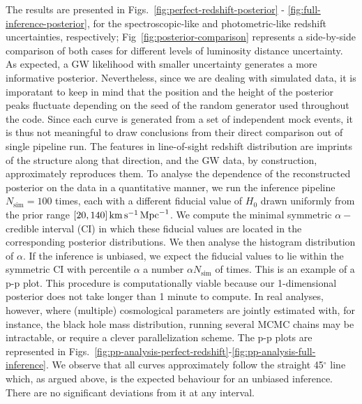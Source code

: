 \documentclass[%
preprint,
nofootinbib,
 amsmath,amssymb,
 aps,
]{revtex4-2}
\begin{document}
The results are presented in Figs.~\ref{fig:perfect-redshift-posterior} -
\ref{fig:full-inference-posterior}, for the spectroscopic-like and photometric-like redshift
uncertainties, respectively; Fig~\ref{fig:posterior-comparison} represents a side-by-side
comparison of both cases for different levels of luminosity distance uncertainty. As expected, a GW
likelihood with smaller uncertainty generates a more informative posterior. Nevertheless, since we
are dealing with simulated data, it is imporatant to keep in mind that the position and the height
of the posterior peaks fluctuate depending on the seed of the random generator used throughout the
code. Since each curve is generated from a set of independent mock events, it is thus not
meaningful to draw conclusions from their direct comparison out of single pipeline run. The
features in line-of-sight redshift distribution are imprints of the structure along that direction,
and the GW data, by construction, approximately reproduces them. To analyse the dependence of the
reconstructed posterior on the data in a quantitative manner, we run the inference pipeline
$N_\text{sim} = 100$ times, each with a different fiducial value of $H_0$ drawn uniformly from the
prior range $[20, 140] \, \rm{km} \, \rm{s}^{-1} \, \rm{Mpc}^{-1}$. We compute the minimal
symmetric $\alpha-$credible interval (CI) in which these fiducial values are located in the
corresponding posterior distributions. We then analyse the histogram distribution of $\alpha$. If
the inference is unbiased, we expect the fiducial values to lie within the symmetric CI with
percentile $\alpha$ a number $\alpha N_\text{sim}$ of times. This is an example of a p-p plot. This
procedure is computationally viable because our 1-dimensional posterior does not take longer than 1
minute to compute. In real analyses, however, where (multiple) cosmological parameters are jointly
estimated with, for instance, the black hole mass distribution, running several MCMC chains may be
intractable, or require a clever parallelization scheme. The p-p plots are represented in
Figs.~\ref{fig:pp-analysis-perfect-redshift}-\ref{fig:pp-analysis-full-inference}. We observe that
all curves approximately follow the straight 45$^{\circ}$ line which, as argued above, is the
expected behaviour for an unbiased inference. There are no significant deviations from it at any
interval.
\end{document}
